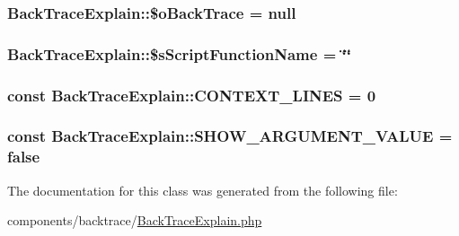 \hypertarget{class_back_trace_explain_9ff2e8e9084fb38b8a436619a417e5d8}{
\subsubsection[{\$oBackTrace}]{\setlength{\rightskip}{0pt plus 5cm}BackTraceExplain::\$oBackTrace = null}}
\label{class_back_trace_explain_9ff2e8e9084fb38b8a436619a417e5d8}


\hypertarget{class_back_trace_explain_bf9c6e181f88cd54aeb6551a98fb6b7b}{
\subsubsection[{\$sScriptFunctionName}]{\setlength{\rightskip}{0pt plus 5cm}BackTraceExplain::\$sScriptFunctionName = \char`\"{}\char`\"{}}}
\label{class_back_trace_explain_bf9c6e181f88cd54aeb6551a98fb6b7b}


\hypertarget{class_back_trace_explain_a43a9dad0003990817f208568687ef4b}{
\subsubsection[{CONTEXT\_\-LINES}]{\setlength{\rightskip}{0pt plus 5cm}const {\bf BackTraceExplain::CONTEXT\_\-LINES} = 0}}
\label{class_back_trace_explain_a43a9dad0003990817f208568687ef4b}


\hypertarget{class_back_trace_explain_c588570f668add1f67e691c222c227b8}{
\subsubsection[{SHOW\_\-ARGUMENT\_\-VALUE}]{\setlength{\rightskip}{0pt plus 5cm}const {\bf BackTraceExplain::SHOW\_\-ARGUMENT\_\-VALUE} = false}}
\label{class_back_trace_explain_c588570f668add1f67e691c222c227b8}




The documentation for this class was generated from the following file:\begin{CompactItemize}
\item 
components/backtrace/\hyperlink{_back_trace_explain_8php}{BackTraceExplain.php}\end{CompactItemize}
